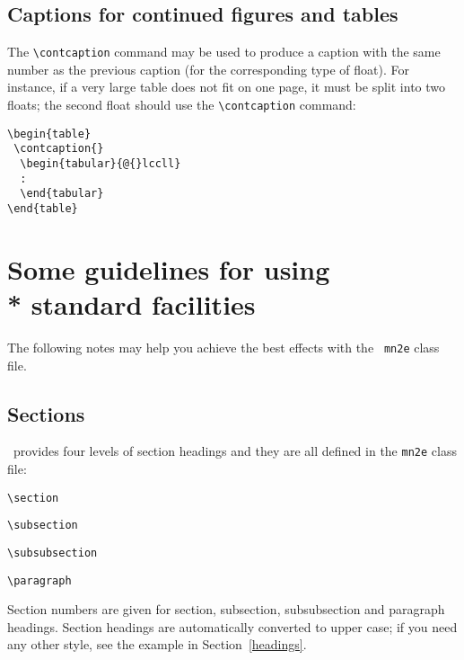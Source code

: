 \documentclass[useAMS,usenatbib]{mn2e}
\begin{document}
\subsection{Captions for continued figures and tables}\label{contfigtab}

The \verb"\contcaption" command may be used to produce a caption with the
same number as the previous caption (for the corresponding type of
float). For instance, if a very large table does not fit on one page,
it must be split into two floats; the second float should use the
\verb"\contcaption" command:
%
\begin{verbatim}
\begin{table}
 \contcaption{}
  \begin{tabular}{@{}lccll}
  :
  \end{tabular}
\end{table}
\end{verbatim}


\section[]{Some guidelines for using\\* standard facilities}

The following notes may help you achieve the best effects with the {\tt
mn2e} class file.

\subsection{Sections}

\LaTeXe\ provides four levels of section headings and they are all
defined in the {\tt mn2e} class file:
\begin{description}
  \item \verb"\section"
  \item \verb"\subsection"
  \item \verb"\subsubsection"
  \item \verb"\paragraph"
\end{description}
Section numbers are given for section, subsection, subsubsection
and paragraph headings.  Section headings are automatically converted to
upper case; if you need any other style, see the example in Section~\ref{headings}.
\end{document}
